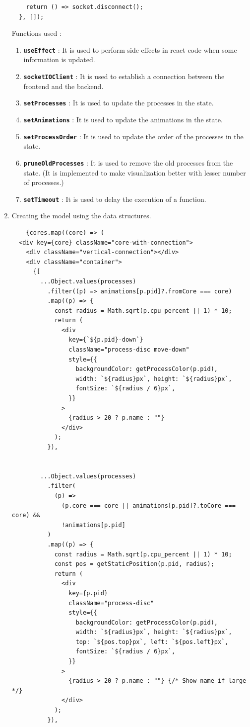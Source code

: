 \documentclass[12pt]{article}
\begin{document}
\begin{enumerate}
\begin{verbatim}
    return () => socket.disconnect();
  }, []);
\end{verbatim}
Functions used :
\begin{enumerate}
    \item \textbf{\texttt{useEffect}} : It is used to perform side effects in react code when some information is updated.
    \item \textbf{\texttt{socketIOClient}} : It is used to establish a connection between the frontend and the backend.
    \item \textbf{\texttt{setProcesses}} : It is used to update the processes in the state.
    \item \textbf{\texttt{setAnimations}} : It is used to update the animations in the state.
    \item \textbf{\texttt{setProcessOrder}} : It is used to update the order of the processes in the state.
    \item \textbf{\texttt{pruneOldProcesses}} : It is used to remove the old processes from the state. (It is implemented to make visualization better with lesser number of processes.)
    \item \textbf{\texttt{setTimeout}} : It is used to delay the execution of a function.
\end{enumerate}
\item Creating the model using the data structures.
\begin{verbatim}
    {cores.map((core) => (
  <div key={core} className="core-with-connection">
    <div className="vertical-connection"></div>
    <div className="container">
      {[
        ...Object.values(processes)
          .filter((p) => animations[p.pid]?.fromCore === core)
          .map((p) => {
            const radius = Math.sqrt(p.cpu_percent || 1) * 10;
            return (
              <div
                key={`${p.pid}-down`}
                className="process-disc move-down"
                style={{
                  backgroundColor: getProcessColor(p.pid), 
                  width: `${radius}px`, height: `${radius}px`,
                  fontSize: `${radius / 6}px`,
                }}
              >
                {radius > 20 ? p.name : ""}
              </div>
            );
          }),

        
        ...Object.values(processes)
          .filter(
            (p) =>
              (p.core === core || animations[p.pid]?.toCore === core) &&
              !animations[p.pid] 
          )
          .map((p) => {
            const radius = Math.sqrt(p.cpu_percent || 1) * 10;
            const pos = getStaticPosition(p.pid, radius);
            return (
              <div
                key={p.pid}
                className="process-disc"
                style={{
                  backgroundColor: getProcessColor(p.pid), 
                  width: `${radius}px`, height: `${radius}px`, 
                  top: `${pos.top}px`, left: `${pos.left}px`, 
                  fontSize: `${radius / 6}px`, 
                }}
              >
                {radius > 20 ? p.name : ""} {/* Show name if large */}
              </div>
            );
          }),


\end{verbatim}
\end{enumerate}
\end{document}
